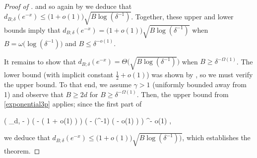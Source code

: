 \begin{proof}[Proof of ]
	\noindent and so again by  we deduce that $d_{B; \delta} (e^{-x}) \le \big( 1 + o(1) \big) \sqrt{B \log (\delta^{-1})}$. Together, these upper and lower bounds imply that $d_{B; \delta} (e^{-x}) = \big( 1 + o(1) \big) \sqrt{B \log (\delta^{-1})}$ when $B = \omega \big( \log (\delta^{-1}) \big)$ and $B \le \delta^{-o(1)}$.
	
	It remains to show that $d_{B; \delta} (e^{-x}) = \Theta \big( \sqrt{B \log (\delta^{-1})} \big)$ when $B \ge \delta^{-\Omega(1)}$. The lower bound (with implicit constant $\frac{1}{2} + o(1)$) was shown by , so we must verify the upper bound. To that end, we assume $\gamma > 1$ (uniformly bounded away from 1) and observe that $B \ge 2d$ for $B \ge \delta^{-\Omega (1)}$. Then, the upper bound from \eqref{exponential3p} applies; since the first part of 
	\begin{flalign*}
	\exp ( \Psi_{d, \lambda} - \lambda) \le \exp \Big( - \displaystyle{} \big( 1 + o(1) \big) \Big) \le \exp \Big( - \log (\delta^{-1}) \big( \gamma - o(1) \big) \Big) \le \delta^{\gamma - o(1)} \le \delta,
    \end{flalign*}
	
	\noindent we deduce that $d_{B; \delta} (e^{-x}) \le \big( 1 + o(1) \big) \sqrt{B \log (\delta^{-1}))}$, which establishes the theorem.
	\end{proof} 






















































